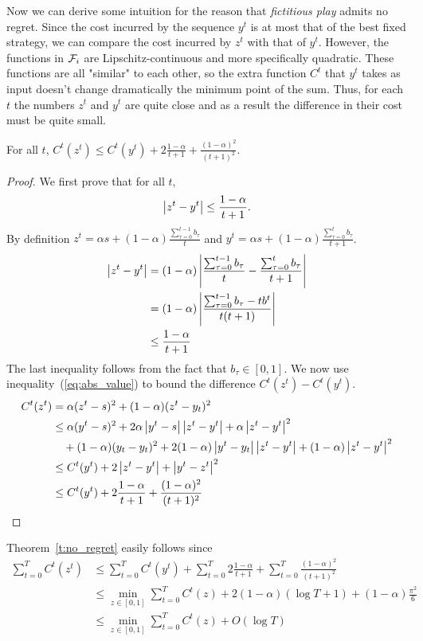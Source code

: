 Now we can derive some intuition for the reason that \emph{fictitious play}
admits no regret. Since the cost incurred by the sequence $y^t$ is at most that
of the best fixed strategy, we can compare the cost incurred by $z^t$ with
that of $y^t$.  However, the functions in $\mathcal{F}_i$ are Lipschitz-continuous and more
specifically quadratic.
These functions are all "similar" to each other, so the extra function $C^t$ that $y^t$ takes
as input doesn't change dramatically the minimum point of the sum.
Thus, for each $t$ the numbers $z^t$ and $y^t$ are quite
close and as a result the difference in their cost must be quite small.

\begin{lemma}
  For all $t$,
  \(C^t(z^t) \leq C^t(y^t) + 2\frac{1-\alpha}{t+1} + \frac{(1-\alpha)^2}{(t+1)^2}\).
\end{lemma}
\begin{proof}
  We first prove that for all $t$,
  \begin{equation}\label{eq:abs_value}
    \left|z^t - y^t \right| \leq \frac{1-\alpha}{t+1}.
  \end{equation}
  By definition
  \(z^t = \alpha s + (1-\alpha)\frac{\sum_{\tau = 0}^{t-1} b_\tau}{t}\)
  and
  \( y^t = \alpha s + (1-\alpha)\frac{\sum_{\tau = 0}^t b_\tau}{t+1}\).
  \begin{align*}
    \left|z^t - y^t\right|
    &=
    (1-\alpha)\left|\frac{\sum_{\tau = 0}^{t-1}b_\tau}{t}
    - \frac{\sum_{\tau = 0}^t b_\tau}{t+1}\right|\\
    &=
    (1-\alpha)\left|\frac{\sum_{\tau = 0}^{t-1}b_\tau -tb^t}{t(t+1)}\right|\\
    &\leq
    \frac{1-\alpha}{t+1}
  \end{align*}
  The last inequality follows from the fact that $b_\tau \in [0,1]$.
  We now use inequality~(\ref{eq:abs_value}) to bound the difference
  \( C^t(z^t) - C^t(y^t) \).
  \begin{align*}
    C^t(z^t)
    &=
    \alpha(z^t - s)^2 + (1 - \alpha)(z^t - y_t)^2 \\
    &\leq
    \alpha(y^t - s)^2 + 2\alpha\left|y^t -
    s\right|\left|z^t - y^t\right| + \alpha \left|z^t - y^t\right|^2 \\
    &\quad + (1-\alpha)(y_t - y_t)^2 +
    2(1-\alpha)\left|y^t - y_t\right|\left|z^t-y^t\right| + (1 - \alpha)\left|z^t - y^t\right|^2\\
    &\leq
    C^t(y^t) + 2\left|z^t - y^t\right| + \left|y^t - z^t\right|^2\\
    &\leq
    C^t(y^t) + 2\frac{1-\alpha}{t+1} + \frac{(1-\alpha)^2}{(t+1)^2}
  \end{align*}
\end{proof}

Theorem~\ref{t:no_regret} easily follows since
\begin{align*}
  \sum_{t=0}^T C^t(z^t)
  &\leq
  \sum_{t=0}^T C^t(y^t) + \sum_{t=0}^T 2\frac{1-\alpha}{t+1} +
  \sum_{t=0}^T \frac{(1-\alpha)^2}{(t+1)^2}\\
  &\leq
  \min_{ z \in [0,1]} \sum_{t=0}^T C^t(z) +
  2(1-\alpha)(\log T + 1) + (1-\alpha)\frac{\pi^2}{6}\\
  &\leq
  \min_{ z \in [0,1]} \sum_{t=0}^T C^t(z) + O(\log T)
\end{align*}
